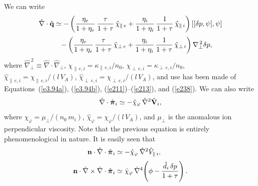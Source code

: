 \documentclass[notitlepage,12pt]{article}
\newcommand{\bpi}{\mbox{\boldmath$\pi$}}
\begin{document}
We can write
\begin{align}
\hat{\nabla}\cdot \hat{\bf q} &\simeq- \left(\frac{\eta_e}{1+\eta_e}\,\frac{\tau}{1+\tau}\,\hat{\chi}_{\parallel\,e} + \frac{\eta_i}{1+\eta_i}\,\frac{1}{1+\tau}\,\hat{\chi}_{\parallel\,i}\right)[[\delta p,\psi],\psi]\nonumber\\[0.5ex]
&\phantom{=} - \left(\frac{\eta_e}{1+\eta_e}\,\frac{\tau}{1+\tau}\,\hat{\chi}_{\perp\,e} + \frac{\eta_i}{1+\eta_i}\,\frac{1}{1+\tau}\,\hat{\chi}_{\perp\,i}\right)\nabla_\perp^{\,2} \delta p,\label{e260}
\end{align}
where $\hat{\nabla}_\perp^{\,2}\equiv \hat{\nabla}\cdot\hat{\nabla}_\perp$, $\chi_{\parallel\,e,i} = \kappa_{\parallel\,e,i}/n_0$, $\chi_{\perp\,e,i} = \kappa_{\perp\,e,i}/n_0$, $\hat{\chi}_{\parallel\,e,i}=
\chi_{\parallel\,e,i}/(l\,V_A)$,  $\hat{\chi}_{\perp\,e,i}=
\chi_{\perp\,e,i}/(l\,V_A)$, and use has been made of Equations~(\ref{e3.94a}),  (\ref{e3.94b}), (\ref{e211})--(\ref{e213}), and (\ref{e238}). 
We can also
write
\begin{equation}
\hat{\nabla}\cdot\hat{\bpi}_i \simeq - \hat{\chi}_\varphi\,\hat{\nabla}^2\hat{\bf V}_i,
\end{equation}
where $\chi_\varphi = \mu_{\perp}/(n_0\,m_i)$, $\hat{\chi}_\varphi = \chi_\varphi/(l\,V_A)$, and $\mu_\perp$ is the anomalous
ion perpendicular viscosity. Note that the previous equation is entirely phenomenological in nature.  It is easily seen that
\begin{align}\label{e262}
{\bf n}\cdot\hat{\nabla}\cdot\hat{\bpi}_i&\simeq -\hat{\chi}_\varphi\,\hat{\nabla}^{2}\hat{V}_{\parallel\,i},\\[0.5ex]
{\bf n}\cdot\hat{\nabla}\times \hat{\nabla}\cdot\hat{\bpi}_i&\simeq \hat{\chi}_\varphi \,\hat{\nabla}^4\!\left(\phi - \frac{\hat{d}_i\,\delta p}{1+\tau}\right).\label{e263}
\end{align}
\end{document}
